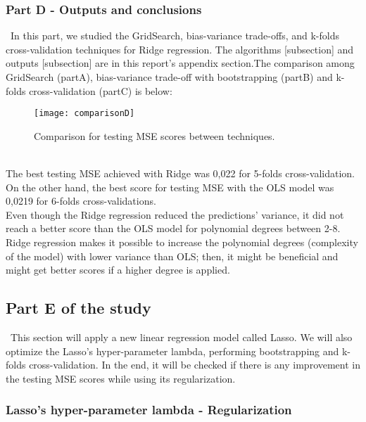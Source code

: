 \subsubsection{Part D - Outputs and conclusions}
\label{chap:Part D - Outputs and conclusions}

\quad \, In this part, we studied the GridSearch, bias-variance trade-offs, and k-folds cross-validation techniques for Ridge regression. The algorithms [subsection] and outputs [subsection] are in this report's appendix section.The comparison among GridSearch (partA), bias-variance trade-off with bootstrapping (partB) and k-folds cross-validation (partC) is below: \\

\begin{figure}[H]
\label{fig:comparisonD}
\texttt{[image: comparisonD]}
\caption{Comparison for testing MSE scores between techniques.}
\centering
\end{figure}\\

The best testing MSE achieved with Ridge was 0,022 for 5-folds cross-validation. On the other hand, the best score for testing MSE with the OLS model was 0,0219 for 6-folds cross-validations. \\ 

Even though the Ridge regression reduced the predictions' variance, it did not reach a better score than the OLS model for polynomial degrees between 2-8. \\

Ridge regression makes it possible to increase the polynomial degrees (complexity of the model) with lower variance than OLS; then, it might be beneficial and might get better scores if a higher degree is applied. \\

\subsection{Part E of the study}
\label{chap:Part E of the study}

\quad \, This section will apply a new linear regression model called Lasso. We will also optimize the Lasso's hyper-parameter lambda, performing bootstrapping and k-folds cross-validation. In the end, it will be checked if there is any improvement in the testing MSE scores while using its regularization. \\

\subsubsection{Lasso's hyper-parameter lambda - Regularization}
\label{chap:Lasso's hyper-parameter lambda - Regularization}

